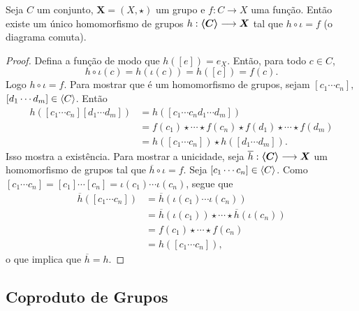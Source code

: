 \begin{prop}
Seja $C$ um conjunto, $\bm X = (X,\star)$ um grupo e $f: C \to X$ uma função. Então existe um único homomorfismo de grupos $h: \bm{\left\langle C \right\rangle} \longrightarrow \bm X$ tal que $h \circ \iota = f$ (o diagrama comuta).
\begin{figure}
\centering
{}
\end{figure}
\end{prop}
\begin{proof}
Defina a função  de modo que $h([e])=e_X$. Então, para todo $c \in C$,
	\begin{equation*}
	h \circ \iota(c) = h (\iota(c)) = h([c])=f(c).
	\end{equation*}
Logo $h \circ \iota = f$. Para mostrar que é um homomorfismo de grupos, sejam $[c_1 \cdots c_n],$ $[d_1 \cdots d_m] \in \left\langle C \right\rangle$. Então
	\begin{align*}
	h([c_1 \cdots c_n][d_1 \cdots d_m]) &= h([c_1 \cdots c_nd_1 \cdots d_m]) \\
		&= f(c_1) \star \cdots \star f(c_n) \star f(d_1) \star \cdots  \star f(d_m) \\
		&= h([c_1 \cdots c_n]) \star h([d_1 \cdots d_m]).
	\end{align*}
Isso mostra a existência. Para mostrar a unicidade, seja $\overline h: \bm{\left\langle C \right\rangle} \longrightarrow \bm X$ um homomorfismo de grupos tal que $\overline h \circ \iota = f$. Seja $[c_1 \cdots c_n] \in \left\langle C \right\rangle$. Como $[c_1 \cdots c_n] = [c_1] \cdots [c_n] = \iota(c_1) \cdots \iota(c_n)$, segue que
	\begin{align*}
	\overline h ([c_1 \cdots c_n]) &= \overline h(\iota(c_1) \cdots \iota(c_n)) \\
		&= \overline h(\iota(c_1)) \star \cdots \star \overline h(\iota(c_n)) \\
		&= f(c_1) \star \cdots \star f(c_n) \\
		&= h([c_1 \cdots c_n]),
	\end{align*}
o que implica que $\overline h = h$.
\end{proof}

\subsection{Coproduto de Grupos}

